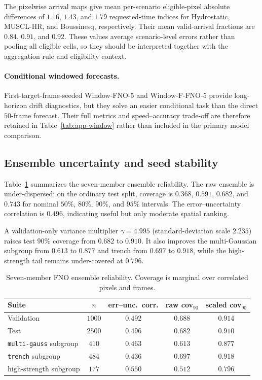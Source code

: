 The pixelwise arrival maps give mean per-scenario eligible-pixel absolute differences of $1.16$, $1.43$, and $1.79$ requested-time indices for Hydrostatic, MUSCL-HR, and Boussinesq, respectively. Their mean valid-arrival fractions are $0.84$, $0.91$, and $0.92$. These values average scenario-level errors rather than pooling all eligible cells, so they should be interpreted together with the aggregation rule and eligibility context.

\paragraph{Conditional windowed forecasts.}
First-target-frame-seeded Window-FNO-5 and Window-F-FNO-5 provide long-horizon drift diagnostics, but they solve an easier conditional task than the direct $50$-frame forecast. Their full metrics and speed--accuracy trade-off are therefore retained in Table~\ref{tab:app-window} rather than included in the primary model comparison.

\FloatBarrier
\subsection{Ensemble uncertainty and seed stability}
\label{subsec:res-uncertainty}

Table~\ref{tab:uncertainty} summarizes the seven-member ensemble reliability. The raw ensemble is under-dispersed: on the ordinary test split, coverage is $0.368$, $0.591$, $0.682$, and $0.743$ for nominal $50\%$, $80\%$, $90\%$, and $95\%$ intervals. The error--uncertainty correlation is $0.496$, indicating useful but only moderate spatial ranking.

A validation-only variance multiplier $\gamma = 4.995$ (standard-deviation scale $2.235$) raises test $90\%$ coverage from $0.682$ to $0.910$. It also improves the multi-Gaussian subgroup from $0.613$ to $0.877$ and trench from $0.697$ to $0.918$, while the high-strength tail remains under-covered at $0.796$.

\begin{table}[pos=!htbp]
\centering
\caption{Seven-member FNO ensemble reliability. Coverage is marginal over correlated pixels and frames.}
\label{tab:uncertainty}
\begin{tabular}{lcccc}
    \toprule
    Suite & $n$ & err--unc.\ corr. & raw cov$_{90}$ & scaled cov$_{90}$ \\
    \midrule
    Validation & $1000$ & $0.492$ & $0.688$ & $0.914$ \\
    Test & $2500$ & $0.496$ & $0.682$ & $0.910$ \\
    \texttt{multi-gauss} subgroup & $410$ & $0.463$ & $0.613$ & $0.877$ \\
    \texttt{trench} subgroup & $484$ & $0.436$ & $0.697$ & $0.918$ \\
    high-strength subgroup & $177$ & $0.550$ & $0.512$ & $0.796$ \\
    \bottomrule
\end{tabular}
\end{table}

